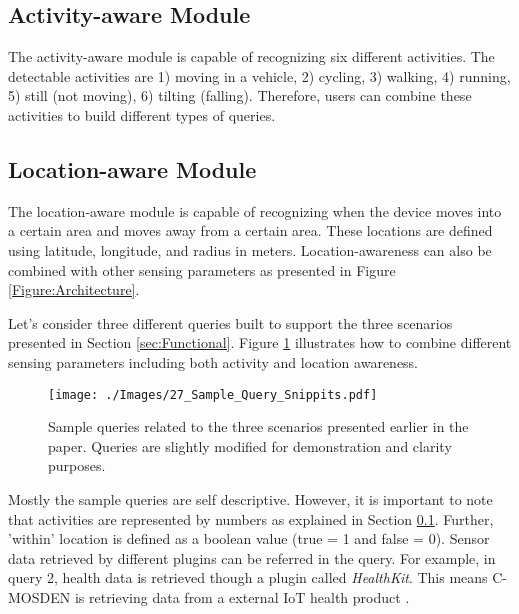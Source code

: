 \documentclass[journal]{IEEEtran}
\begin{document}
\subsection{Activity-aware Module}
\label{sec:Activity}
The activity-aware module is capable of recognizing six different activities. The detectable activities are 1) moving in a vehicle, 2) cycling, 3) walking, 4) running, 5) still (not moving), 6) tilting (falling). Therefore, users can combine these activities to build different types of queries. 






\subsection{Location-aware Module}

The location-aware module is capable of recognizing when the device moves into a certain area and moves away from a certain area. These locations are defined using latitude, longitude, and radius in meters. Location-awareness can also be combined with other sensing parameters as presented in Figure \ref{Figure:Architecture}.

Let's consider three different queries built to support the three scenarios presented in Section \ref{sec:Functional}. Figure \ref{Figure:Sample_Query_Snippits} illustrates how to combine different sensing parameters including both activity and location awareness.

\begin{figure}[h]
 \centering
\texttt{[image: ./Images/27\_Sample\_Query\_Snippits.pdf]}
\caption{Sample queries related to the three scenarios presented earlier in the paper. Queries are slightly modified for demonstration and clarity purposes.}
 \label{Figure:Sample_Query_Snippits}	
\end{figure}

Mostly the sample queries are self descriptive. However, it is important to note that activities are represented by numbers as explained in Section \ref{sec:Activity}. Further, 'within' location is defined as a boolean value (true = 1 and false = 0). Sensor data retrieved by different plugins\cite{ZMC008} can be referred in the query. For example, in query 2, health data is retrieved though a plugin  called \textit{HealthKit}. This means C-MOSDEN is retrieving data from a external IoT health product \cite{ZMJ007}.
\end{document}
